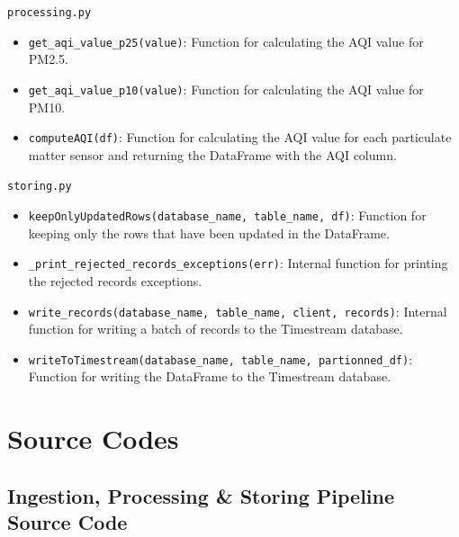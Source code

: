 \documentclass[12pt,oneside]{book} %
\begin{document}
\begin{appendices}
\begin{subappendices}
\begin{description}
            \item \texttt{processing.py}
                  \begin{itemize}
                      \item \texttt{get\_aqi\_value\_p25(value)}: Function for calculating the AQI value for PM2.5.
                      \item \texttt{get\_aqi\_value\_p10(value)}: Function for calculating the AQI value for PM10.
                      \item \texttt{computeAQI(df)}: Function for calculating the AQI value for each particulate matter sensor and returning the DataFrame with the AQI column.
                  \end{itemize}

            \item \texttt{storing.py}
                  \begin{itemize}
                      \item \texttt{keepOnlyUpdatedRows(database\_name, table\_name, df)}: Function for keeping only the rows that have been updated in the DataFrame.
                      \item \texttt{\_print\_rejected\_records\_exceptions(err)}: Internal function for printing the rejected records exceptions.
                      \item \texttt{write\_records(database\_name, table\_name, client, records)}: Internal function for writing a batch of records to the Timestream database.
                      \item \texttt{writeToTimestream(database\_name, table\_name, partionned\_df)}: Function for writing the DataFrame to the Timestream database.
                  \end{itemize}
        \end{description}
    \end{subappendices}

    \chapter{Source Codes}
    \begin{subappendices}
        \section{Ingestion, Processing \& Storing Pipeline Source Code}
        \lstset{style=python}
        


\end{subappendices}
\end{appendices}
\end{document}

